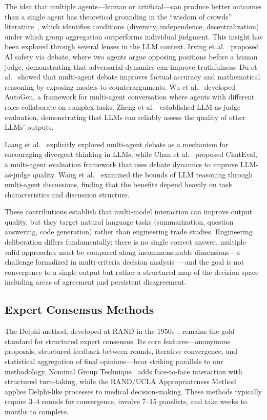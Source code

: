 \documentclass[11pt,a4paper]{article}
\begin{document}
The idea that multiple agents---human or artificial---can produce better outcomes than a single agent has theoretical grounding in the ``wisdom of crowds'' literature~\cite{surowiecki2004wisdom}, which identifies conditions (diversity, independence, decentralization) under which group aggregation outperforms individual judgment. This insight has been explored through several lenses in the LLM context. Irving et al.~\cite{irving2018debate} proposed AI safety via debate, where two agents argue opposing positions before a human judge, demonstrating that adversarial dynamics can improve truthfulness. Du et al.~\cite{du2023debate} showed that multi-agent debate improves factual accuracy and mathematical reasoning by exposing models to counterarguments. Wu et al.~\cite{wu2023autogen} developed AutoGen, a framework for multi-agent conversation where agents with different roles collaborate on complex tasks. Zheng et al.~\cite{zheng2024judging} established LLM-as-judge evaluation, demonstrating that LLMs can reliably assess the quality of other LLMs' outputs.

Liang et al.~\cite{liang2024encouraging} explicitly explored multi-agent debate as a mechanism for encouraging divergent thinking in LLMs, while Chan et al.~\cite{chan2024chateval} proposed ChatEval, a multi-agent evaluation framework that uses debate dynamics to improve LLM-as-judge quality. Wang et al.~\cite{wang2024rethinking} examined the bounds of LLM reasoning through multi-agent discussions, finding that the benefits depend heavily on task characteristics and discussion structure.

These contributions establish that multi-model interaction can improve output quality, but they target natural language tasks (summarization, question answering, code generation) rather than engineering trade studies. Engineering deliberation differs fundamentally: there is no single correct answer, multiple valid approaches must be compared along incommensurable dimensions---a challenge formalized in multi-criteria decision analysis~\cite{keeney1976decisions}---and the goal is not convergence to a single output but rather a structured map of the decision space including areas of agreement and persistent disagreement.

\subsection{Expert Consensus Methods}

The Delphi method, developed at RAND in the 1950s~\cite{linstone1975delphi,dalkey1963experimental}, remains the gold standard for structured expert consensus. Its core features---anonymous proposals, structured feedback between rounds, iterative convergence, and statistical aggregation of final opinions---bear striking parallels to our methodology. Nominal Group Technique~\cite{delbecq1975group} adds face-to-face interaction with structured turn-taking, while the RAND/UCLA Appropriateness Method~\cite{fitch2001rand} applies Delphi-like processes to medical decision-making. These methods typically require 3--4 rounds for convergence, involve 7--15 panelists, and take weeks to months to complete.
\end{document}

